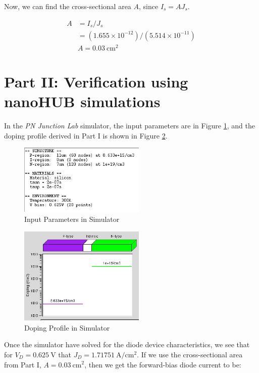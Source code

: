\documentclass{IEEEtran}
\begin{document}
Now, we can find the cross-sectional area \(A\), since \(I_s = AJ_s\).

\begin{align*}
    A &= I_s / J_s \\ 
      &= (1.655\times10^{-12}) / (5.514\times10^{-11}) \\
      & \boxed{A = 0.03 ~ \text{cm}^2}
\end{align*}

\section*{Part II: Verification using nanoHUB simulations}

In the \textit{PN Junction Lab} simulator, the input parameters are in Figure \ref{fig:inputs}, and the doping profile derived in Part I is shown in Figure \ref{fig:doping}.

\begin{figure}[!ht] 
    \centering
    \includegraphics[width = 6cm]{inputs.jpg}
    \caption{Input Parameters in Simulator}
    \label{fig:inputs}
\end{figure}

\begin{figure}[!ht] 
    \centering
    \includegraphics[width = 6cm]{doping.jpg}
    \caption{Doping Profile in Simulator}
    \label{fig:doping}
\end{figure}

Once the simulator have solved for the diode device characteristics, we see that for \(V_D = 0.625~\text{V}\) that \(J_D = 1.71751~\text{A} / \text{cm}^2 \). If we use the cross-sectional area from Part I, \(A = 0.03 ~ \text{cm}^2\), then we get the forward-bias diode current to be:
\end{document}
